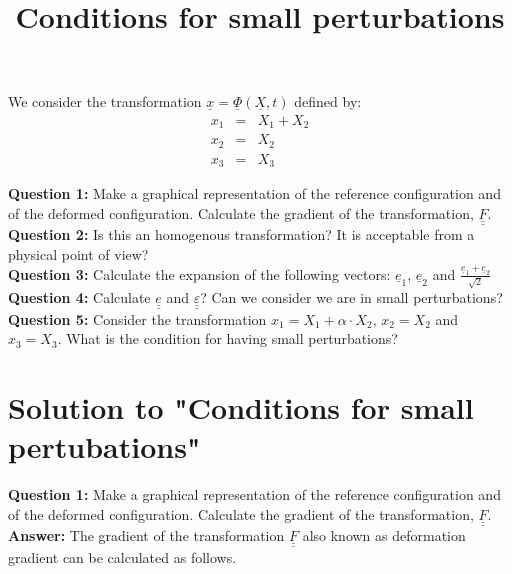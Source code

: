 \documentclass[letter,12pt]{article}
\newcommand{\TT}[1]{\underline{\underline{#1}}}
\newcommand{\T}[1]{\underline{#1}}
\begin{document}
\pagestyle{fancy}

\title{\textbf{Conditions for small perturbations}}
\date{}

\maketitle

\vspace{-1cm}

We consider the transformation  $\T{x}=\T{\Phi}(\T{X},t)$ defined by: 
\begin{eqnarray}
	x_1 & = & X_1+X_2 \\ 
	x_2 & = & X_2 \\ 
	x_3 & = & X_3 
\end{eqnarray}



	\noindent \textbf{Question 1:} Make a graphical representation of the reference configuration and of the deformed configuration. Calculate the gradient of the transformation, $\TT{F}$. \\
	
	\noindent \textbf{Question 2:} Is this an homogenous transformation? It is acceptable from a physical point of view? \\
	
	\noindent \textbf{Question 3:} Calculate the expansion of the following vectors: $\T{e}_1$, $\T{e}_2$ and $\frac{\T{e}_1+\T{e}_2}{\sqrt{2}}$ \\
	
	\noindent \textbf{Question 4:} Calculate $\TT{e}$ and $\TT{\varepsilon}$? Can we consider we are in small perturbations? \\
	
	\noindent \textbf{Question 5:} Consider the transformation $x_1=X_1+\alpha \cdot X_2$, $x_2=X_2$ and $x_3=X_3$. What is the condition for having small perturbations?


\newpage
\section*{Solution to "Conditions for small pertubations"} 

	\noindent \textbf{Question 1:} Make a graphical representation of the reference configuration and of the deformed configuration. Calculate the gradient of the transformation, $\TT{F}$. \\
	
	\textbf{Answer:} The gradient of the transformation $\TT{F}$ also known as deformation gradient can be calculated as follows.
	
\end{document}

